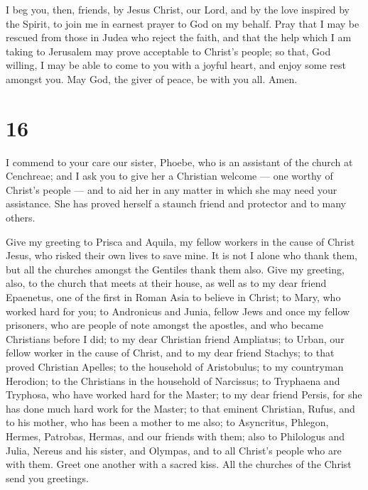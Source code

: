  I beg you, then, friends, by Jesus Christ, our Lord, and
by the love inspired by the Spirit, to join me in earnest prayer to God
on my behalf.  Pray that I may be rescued from those in
Judea who reject the faith, and that the help which I am taking to
Jerusalem may prove acceptable to Christ's people;  so
that, God willing, I may be able to come to you with a joyful heart, and
enjoy some rest amongst you.  May God, the giver of peace,
be with you all. Amen.

\hypertarget{section-15}{%
\section{16}\label{section-15}}

 I commend to your care our sister, Phoebe, who is an
assistant of the church at Cenchreae;  and I ask you to give
her a Christian welcome --- one worthy of Christ's people --- and to aid
her in any matter in which she may need your assistance. She has proved
herself a staunch friend and protector and to many others.

 Give my greeting to Prisca and Aquila, my fellow workers in
the cause of Christ Jesus,  who risked their own lives to
save mine. It is not I alone who thank them, but all the churches
amongst the Gentiles thank them also.  Give my greeting,
also, to the church that meets at their house, as well as to my dear
friend Epaenetus, one of the first in Roman Asia to believe in Christ;
 to Mary, who worked hard for you;  to
Andronicus and Junia, fellow Jews and once my fellow prisoners, who are
people of note amongst the apostles, and who became Christians before I
did;  to my dear Christian friend Ampliatus;  to
Urban, our fellow worker in the cause of Christ, and to my dear friend
Stachys;  to that proved Christian Apelles; to the
household of Aristobulus;  to my countryman Herodion; to
the Christians in the household of Narcissus;  to Tryphaena
and Tryphosa, who have worked hard for the Master; to my dear friend
Persis, for she has done much hard work for the Master;  to
that eminent Christian, Rufus, and to his mother, who has been a mother
to me also;  to Asyncritus, Phlegon, Hermes, Patrobas,
Hermas, and our friends with them;  also to Philologus and
Julia, Nereus and his sister, and Olympas, and to all Christ's people
who are with them.  Greet one another with a sacred kiss.
All the churches of the Christ send you greetings.

